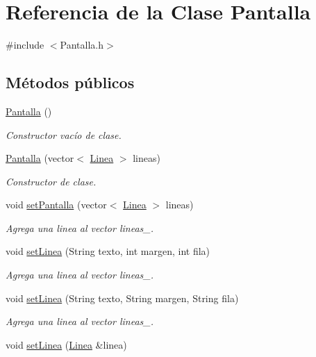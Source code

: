 \hypertarget{classPantalla}{}\section{Referencia de la Clase Pantalla}
\label{classPantalla}


{\ttfamily \#include $<$Pantalla.\+h$>$}

\subsection*{Métodos públicos}
\begin{DoxyCompactItemize}
\item 
\hyperlink{classPantalla_a75c7041a4ffcb3b911ff286fd0a45d30}{Pantalla} ()
\begin{DoxyCompactList}\small\item\em Constructor vacío de clase. \end{DoxyCompactList}\item 
\hyperlink{classPantalla_ac12a27baa3ba722fa7a98152d3561ef4}{Pantalla} (vector$<$ \hyperlink{classLinea}{Linea} $>$ lineas)
\begin{DoxyCompactList}\small\item\em Constructor de clase. \end{DoxyCompactList}\item 
void \hyperlink{classPantalla_a32dc100c46df7110cfd86b06a0890c7b}{set\+Pantalla} (vector$<$ \hyperlink{classLinea}{Linea} $>$ lineas)
\begin{DoxyCompactList}\small\item\em Agrega una linea al vector lineas\+\_\+. \end{DoxyCompactList}\item 
void \hyperlink{classPantalla_ab598291d3cc6a8361759d5f9afff4691}{set\+Linea} (String texto, int margen, int fila)
\begin{DoxyCompactList}\small\item\em Agrega una linea al vector lineas\+\_\+. \end{DoxyCompactList}\item 
void \hyperlink{classPantalla_a27c9c4d5447f4f87970da14979bc3aef}{set\+Linea} (String texto, String margen, String fila)
\begin{DoxyCompactList}\small\item\em Agrega una linea al vector lineas\+\_\+. \end{DoxyCompactList}\item 
void \hyperlink{classPantalla_a991d61db1425865ff6f997b529ea587e}{set\+Linea} (\hyperlink{classLinea}{Linea} \&linea)

\end{DoxyCompactItemize}
